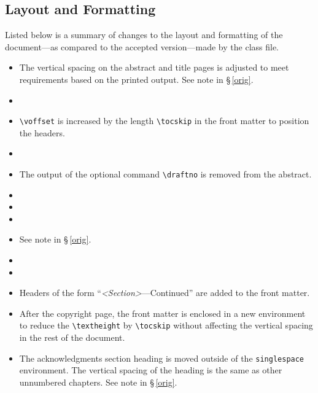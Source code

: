 \begin{spacing}{1.55}
\subsection{Layout and Formatting}
\label{class_details}
Listed below is a summary of changes to the layout and formatting of the document---as compared to the accepted version---made by the class file.  
\begin{itemize}
\setlength{\itemsep}{-4pt}	
	\item The vertical spacing on the abstract and title pages is adjusted to meet requirements based on the printed output.  See note in \S\,\ref{orig}.
	\item {}
	\item \verb|\voffset| is increased by the length \verb|\tocskip| in the front matter to position the headers.  
	\item {}
	\item The output of the optional command \verb|\draftno| is removed from the abstract.
	\item {}
	\item {}
	\item {}
	\item {} See note in \S\,\ref{orig}.
	\item {}
	\item {}
	\item Headers of the form ``\textit{<Section>}---Continued'' are added to the front matter.  
	\item After the copyright page, the front matter is enclosed in a new environment to reduce the \verb|\textheight| by \verb|\tocskip| without affecting the vertical spacing in the rest of the document.
	\item The acknowledgments section heading is moved outside of the \texttt{singlespace} environment.  The vertical spacing of the heading is the same as other unnumbered chapters.  See note in \S\,\ref{orig}.

\end{itemize}
\end{spacing}
